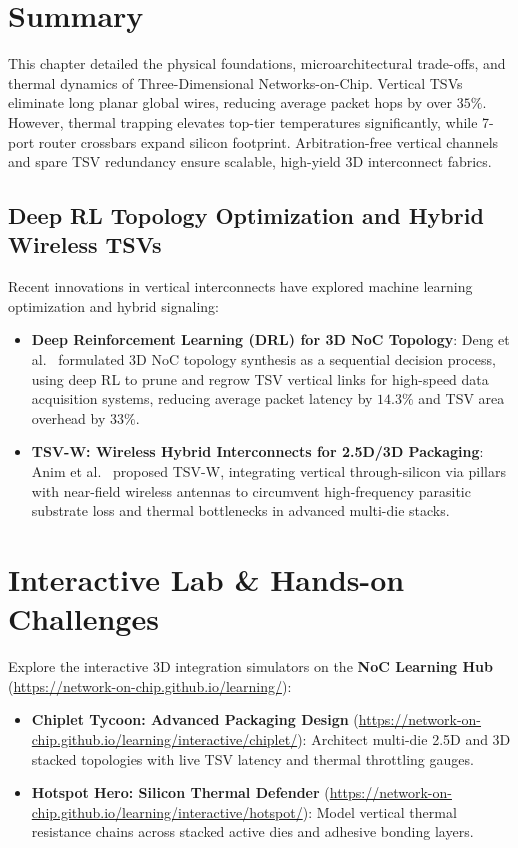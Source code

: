 \section{Summary}
\label{sec:ch8_summary}

This chapter detailed the physical foundations, microarchitectural trade-offs, and thermal dynamics of Three-Dimensional Networks-on-Chip. Vertical TSVs eliminate long planar global wires, reducing average packet hops by over $35\%$. However, thermal trapping elevates top-tier temperatures significantly, while 7-port router crossbars expand silicon footprint. Arbitration-free vertical channels and spare TSV redundancy ensure scalable, high-yield 3D interconnect fabrics.

\subsection{Deep RL Topology Optimization and Hybrid Wireless TSVs}
\label{sec:ch8_drl_wireless}
Recent innovations in vertical interconnects have explored machine learning optimization and hybrid signaling:
\begin{itemize}
    \item \textbf{Deep Reinforcement Learning (DRL) for 3D NoC Topology}: Deng et al.~\cite{Deng2026DRL} formulated 3D NoC topology synthesis as a sequential decision process, using deep RL to prune and regrow TSV vertical links for high-speed data acquisition systems, reducing average packet latency by $14.3\%$ and TSV area overhead by $33\%$.
    \item \textbf{TSV-W: Wireless Hybrid Interconnects for 2.5D/3D Packaging}: Anim et al.~\cite{Anim2026TSVW} proposed TSV-W, integrating vertical through-silicon via pillars with near-field wireless antennas to circumvent high-frequency parasitic substrate loss and thermal bottlenecks in advanced multi-die stacks.
\end{itemize}

\section{Interactive Lab \& Hands-on Challenges}
\label{sec:ch8_interactive}

Explore the interactive 3D integration simulators on the \textbf{NoC Learning Hub} (\url{https://network-on-chip.github.io/learning/}):
\begin{itemize}
    \item \textbf{Chiplet Tycoon: Advanced Packaging Design} (\url{https://network-on-chip.github.io/learning/interactive/chiplet/}): Architect multi-die 2.5D and 3D stacked topologies with live TSV latency and thermal throttling gauges.
    \item \textbf{Hotspot Hero: Silicon Thermal Defender} (\url{https://network-on-chip.github.io/learning/interactive/hotspot/}): Model vertical thermal resistance chains across stacked active dies and adhesive bonding layers.
\end{itemize}

